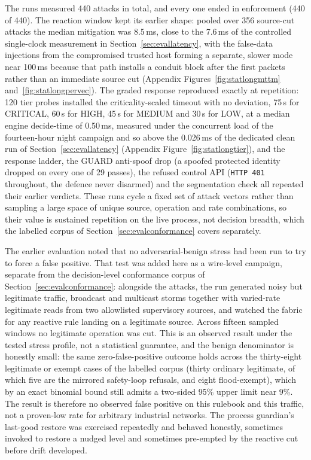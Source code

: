 The runs measured 440 attacks in total, and every one ended in enforcement (440 of 440). The reaction window kept its earlier shape: pooled over 356 source-cut attacks the median mitigation was 8.5\,ms, close to the 7.6\,ms of the controlled single-clock measurement in Section~\ref{sec:evallatency}, with the false-data injections from the compromised trusted host forming a separate, slower mode near 100\,ms because that path installs a conduit block after the first packets rather than an immediate source cut (Appendix Figures~\ref{fig:statlongmttm} and~\ref{fig:statlongpervec}). The graded response reproduced exactly at repetition: 120 tier probes installed the criticality-scaled timeout with no deviation, 75\,s for CRITICAL, 60\,s for HIGH, 45\,s for MEDIUM and 30\,s for LOW, at a median engine decide-time of 0.50\,ms, measured under the concurrent load of the fourteen-hour night campaign and so above the 0.026\,ms of the dedicated clean run of Section~\ref{sec:evallatency} (Appendix Figure~\ref{fig:statlongtier}), and the response ladder, the GUARD anti-spoof drop (a spoofed protected identity dropped on every one of 29 passes), the refused control API (\texttt{HTTP 401} throughout, the defence never disarmed) and the segmentation check all repeated their earlier verdicts. These runs cycle a fixed set of attack vectors rather than sampling a large space of unique source, operation and rate combinations, so their value is sustained repetition on the live process, not decision breadth, which the labelled corpus of Section~\ref{sec:evalconformance} covers separately.

The earlier evaluation noted that no adversarial-benign stress had been run to try to force a false positive. That test was added here as a wire-level campaign, separate from the decision-level conformance corpus of Section~\ref{sec:evalconformance}: alongside the attacks, the run generated noisy but legitimate traffic, broadcast and multicast storms together with varied-rate legitimate reads from two allowlisted supervisory sources, and watched the fabric for any reactive rule landing on a legitimate source. Across fifteen sampled windows no legitimate operation was cut. This is an observed result under the tested stress profile, not a statistical guarantee, and the benign denominator is honestly small: the same zero-false-positive outcome holds across the thirty-eight legitimate or exempt cases of the labelled corpus (thirty ordinary legitimate, of which five are the mirrored safety-loop refusals, and eight flood-exempt), which by an exact binomial bound still admits a two-sided 95\% upper limit near 9\%. The result is therefore no observed false positive on this rulebook and this traffic, not a proven-low rate for arbitrary industrial networks. The process guardian's last-good restore was exercised repeatedly and behaved honestly, sometimes invoked to restore a nudged level and sometimes pre-empted by the reactive cut before drift developed.

